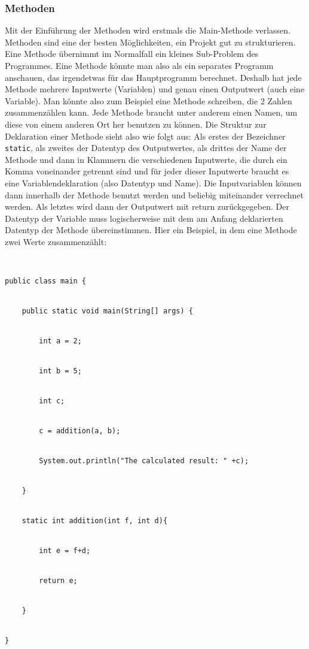 \subsubsection{Methoden}


Mit der Einführung der Methoden wird erstmals die Main-Methode verlassen. Methoden sind eine der besten Möglichkeiten, ein Projekt gut zu strukturieren. Eine Methode übernimmt im Normalfall ein kleines Sub-Problem des Programmes. Eine Methode könnte man also als ein separates Programm anschauen, das irgendetwas für das Hauptprogramm berechnet. Deshalb hat jede Methode mehrere Inputwerte (Variablen) und genau einen Outputwert (auch eine Variable). Man könnte also zum Beispiel eine Methode schreiben, die 2 Zahlen zusammenzählen kann. Jede Methode braucht unter anderem einen Namen, um diese von einem anderen Ort her benutzen zu können. Die Struktur zur Deklaration einer Methode sieht also wie folgt aus: Als erstes der Bezeichner \verb|static|, als zweites der Datentyp des Outputwertes, als drittes der Name der Methode und dann in Klammern die verschiedenen Inputwerte, die durch ein Komma voneinander getrennt sind und für jeder dieser Inputwerte braucht es eine Variablendeklaration (also Datentyp und Name). Die Inputvariablen können dann innerhalb der Methode benutzt werden und beliebig miteinander verrechnet werden. Als letztes wird dann der Outputwert mit return zurückgegeben. Der Datentyp der Variable muss logischerweise mit dem am Anfang deklarierten Datentyp der Methode übereinstimmen. Hier ein Beispiel, in dem eine Methode zwei Werte zusammenzählt:


\begin{lstlisting}


public class main {


	public static void main(String[] args) {


		int a = 2;


		int b = 5;


		int c;


		c = addition(a, b);


		System.out.println("The calculated result: " +c);


	}


	static int addition(int f, int d){


		int e = f+d;


		return e;


	}


}


\end{lstlisting}


